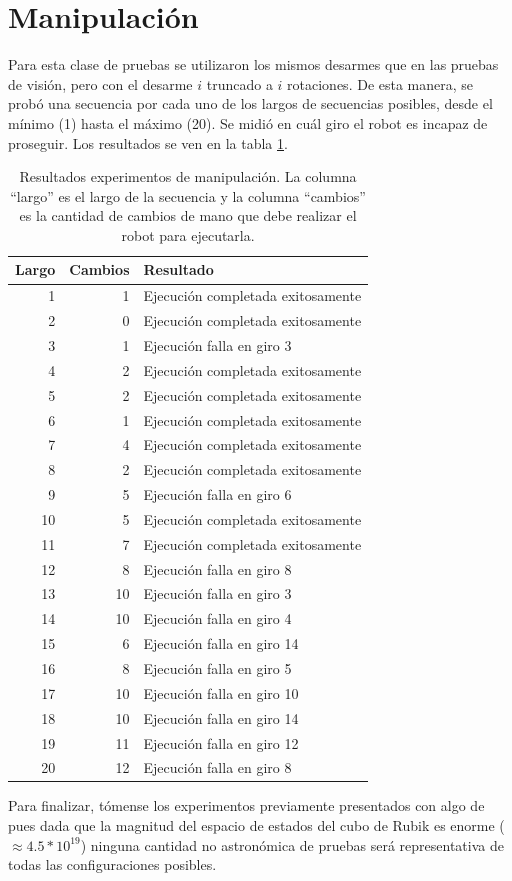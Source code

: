 \section{Manipulación}
Para esta clase de pruebas se utilizaron los mismos desarmes que en las pruebas de visión, pero con el desarme $i$ truncado a $i$ rotaciones. De esta manera, se probó una secuencia por cada uno de los largos de secuencias posibles, desde el mínimo (1) hasta el máximo (20). Se midió en cuál giro el robot es incapaz de proseguir. Los resultados se ven en la tabla \ref{resultadogiros}.

\begin{table}[h!]
	\centering
	\begin{tabular}{|r|r|l|}
		\hline
		Largo & Cambios & Resultado \\ \hline \hline
		 1 & 1 & Ejecución completada exitosamente \\ \hline
		 2 & 0 & Ejecución completada exitosamente \\ \hline
		 3 & 1 & Ejecución falla en giro 3 \\ \hline
		 4 & 2 & Ejecución completada exitosamente \\ \hline
		 5 & 2 & Ejecución completada exitosamente \\ \hline
		 6 & 1 & Ejecución completada exitosamente \\ \hline
		 7 & 4 & Ejecución completada exitosamente \\ \hline
		 8 & 2 & Ejecución completada exitosamente \\ \hline
		 9 & 5 & Ejecución falla en giro 6 \\ \hline
		10 & 5 & Ejecución completada exitosamente \\ \hline
		11 & 7 & Ejecución completada exitosamente \\ \hline
		12 & 8 & Ejecución falla en giro 8 \\ \hline
		13 & 10 & Ejecución falla en giro 3 \\ \hline
		14 & 10 & Ejecución falla en giro 4 \\ \hline
		15 & 6 & Ejecución falla en giro 14 \\ \hline
		16 & 8 & Ejecución falla en giro 5 \\ \hline
		17 & 10 & Ejecución falla en giro 10 \\ \hline
		18 & 10 & Ejecución falla en giro 14 \\ \hline
		19 & 11 & Ejecución falla en giro 12 \\ \hline
		20 & 12 & Ejecución falla en giro 8 \\ \hline
	\end{tabular}
	\caption{Resultados experimentos de manipulación. La columna ``largo'' es el largo de la secuencia y la columna ``cambios'' es la cantidad de cambios de mano que debe realizar el robot para ejecutarla.}
	\label{resultadogiros}
\end{table}

Para finalizar, tómense los experimentos previamente presentados con algo de pues dada que la magnitud del espacio de estados del cubo de Rubik es enorme ($\approx 4.5*10^{19}$) ninguna cantidad no astronómica de pruebas será representativa de todas las configuraciones posibles.
